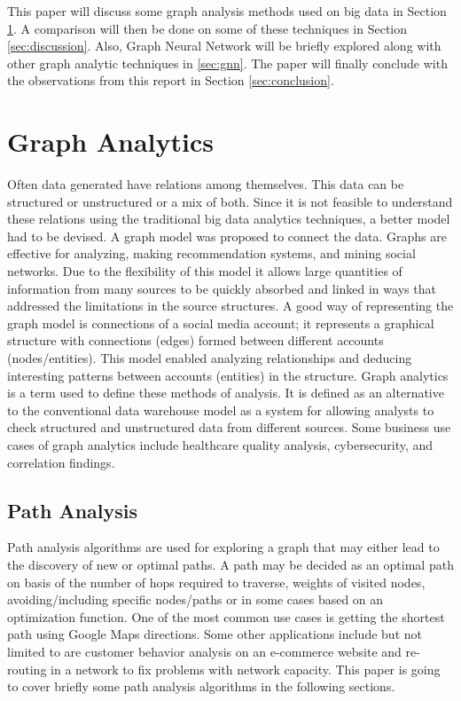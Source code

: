 \documentclass[journal,twoside,web]{ieeecolor}
\begin{document}
This paper will discuss some graph analysis methods used on big data in Section \ref{sec:lit_review}. A comparison will then be done on some of these techniques in Section \ref{sec:discussion}. Also, Graph Neural Network will be briefly explored along with other graph analytic techniques in \ref{sec:gnn}. The paper will finally conclude with the observations from this report in Section \ref{sec:conclusion}.

\section{Graph Analytics}
\label{sec:lit_review}
Often data generated have relations among themselves. This data can be structured or unstructured or a mix of both. Since it is not feasible to understand these relations using the traditional big data analytics techniques, a better model had to be devised. A graph model was proposed to connect the data. Graphs are effective for analyzing, making recommendation systems, and mining social networks. Due to the flexibility of this model it allows large quantities of information from many sources to be quickly absorbed and linked in ways that addressed the limitations in the source structures. A good way of representing the graph model is connections of a social media account; it represents a graphical structure with connections (edges) formed between different accounts (nodes/entities). This model enabled analyzing relationships and deducing interesting patterns between accounts (entities) in the structure. Graph analytics is a term used to define these methods of analysis. It is defined as an alternative to the conventional data warehouse model as a system for allowing analysts to check structured and unstructured data from different sources. Some business use cases of graph analytics include healthcare quality analysis, cybersecurity, and correlation findings.

\subsection{Path Analysis}
Path analysis algorithms are used for exploring a graph that may either lead to the discovery of new or optimal paths. A path may be decided as an optimal path on basis of the number of hops required to traverse, weights of visited nodes, avoiding/including specific nodes/paths or in some cases based on an optimization function. One of the most common use cases is getting the shortest path using Google Maps directions. Some other applications include but not limited to are customer behavior analysis on an e-commerce website and re-routing in a network to fix problems with network capacity. This paper is going to cover briefly some path analysis algorithms in the following sections.
\end{document}
